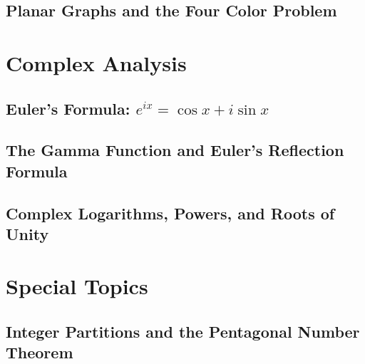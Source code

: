 \documentclass[11pt,a4paper,twoside]{book}
\theoremstyle{eulerstyle}
\theoremstyle{definition}
\begin{document}
\cleardoublepage

\chapter{Planar Graphs and the Four Color Problem}
\label{ch:planar}
%

\cleardoublepage

\part{Complex Analysis}
\parttoc

\chapter{Euler's Formula: $e^{ix} = \cos x + i\sin x$}
\label{ch:euler_formula}


\cleardoublepage

\chapter{The Gamma Function and Euler's Reflection Formula}
\label{ch:gamma}


\cleardoublepage

\chapter{Complex Logarithms, Powers, and Roots of Unity}
\label{ch:complex_log}
%

\cleardoublepage

\part{Special Topics}
\parttoc

\chapter{Integer Partitions and the Pentagonal Number Theorem}
\label{ch:partitions}
%
\end{document}

